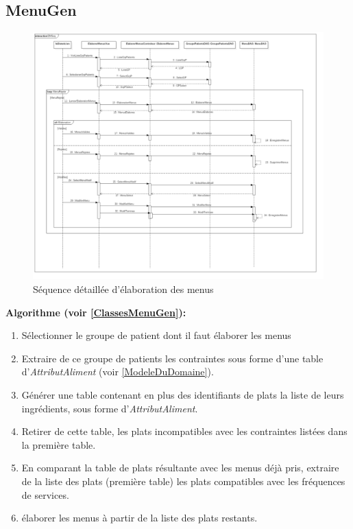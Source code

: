 \subsection{MenuGen}
\begin{figure}
  \centering
      \includegraphics[width=1.00\textwidth]{../../CasDUtilisations/MenuGen/Sequence/EMSeq.png} %
\caption{Séquence détaillée d'élaboration des menus}
\label{MenuGenSeqDetail}
\end{figure}

\textbf{Algorithme (voir \autoref{ClassesMenuGen}):}
\begin{enumerate}
\item Sélectionner le groupe de patient dont il faut élaborer les menus
\item Extraire de ce groupe de patients les contraintes sous forme d'une table d'\emph{AttributAliment} (voir \autoref{ModeleDuDomaine}).
\item Générer une table contenant en plus des identifiants de plats la liste de leurs ingrédients, sous forme d'\emph{AttributAliment}.
\item Retirer de cette table, les plats incompatibles avec les contraintes listées dans la première table.
\item En comparant la table de plats résultante avec les menus déjà pris, extraire de la liste des plats (première table) les plats compatibles avec les fréquences de services.
\item élaborer les menus à partir de la liste des plats restants.
\end{enumerate}

